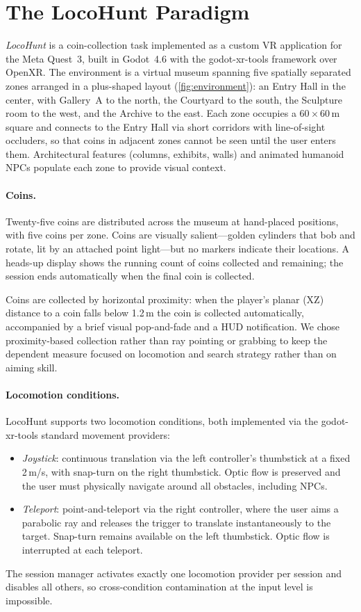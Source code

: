 \documentclass{vgtc}
\begin{document}
\section{The LocoHunt Paradigm}
\label{sec:system}

\emph{LocoHunt} is a coin-collection task implemented as a custom VR application for the Meta Quest~3, built in Godot~4.6 with the godot-xr-tools framework over OpenXR. The environment is a virtual museum spanning five spatially separated zones arranged in a plus-shaped layout (\autoref{fig:environment}): an Entry Hall in the center, with Gallery~A to the north, the Courtyard to the south, the Sculpture room to the west, and the Archive to the east. Each zone occupies a 60\,$\times$\,60\,m square and connects to the Entry Hall via short corridors with line-of-sight occluders, so that coins in adjacent zones cannot be seen until the user enters them. Architectural features (columns, exhibits, walls) and animated humanoid NPCs populate each zone to provide visual context.

\paragraph{Coins.} Twenty-five coins are distributed across the museum at hand-placed positions, with five coins per zone. Coins are visually salient---golden cylinders that bob and rotate, lit by an attached point light---but no markers indicate their locations. A heads-up display shows the running count of coins collected and remaining; the session ends automatically when the final coin is collected.

Coins are collected by horizontal proximity: when the player's planar (XZ) distance to a coin falls below 1.2\,m the coin is collected automatically, accompanied by a brief visual pop-and-fade and a HUD notification. We chose proximity-based collection rather than ray pointing or grabbing to keep the dependent measure focused on locomotion and search strategy rather than on aiming skill.

\paragraph{Locomotion conditions.} LocoHunt supports two locomotion conditions, both implemented via the godot-xr-tools standard movement providers:

\begin{itemize}
\item \emph{Joystick}: continuous translation via the left controller's thumbstick at a fixed 2\,m/s, with snap-turn on the right thumbstick. Optic flow is preserved and the user must physically navigate around all obstacles, including NPCs.
\item \emph{Teleport}: point-and-teleport via the right controller, where the user aims a parabolic ray and releases the trigger to translate instantaneously to the target. Snap-turn remains available on the left thumbstick. Optic flow is interrupted at each teleport.
\end{itemize}
The session manager activates exactly one locomotion provider per session and disables all others, so cross-condition contamination at the input level is impossible.
\end{document}
